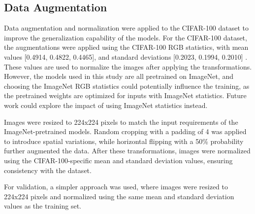 




\subsection{Data Augmentation}
Data augmentation and normalization were applied to the CIFAR-100 dataset to improve the generalization capability of the models. For the CIFAR-100 dataset, the augmentations were applied using the CIFAR-100 RGB statistics, with mean values [0.4914, 0.4822, 0.4465], and standard deviations [0.2023, 0.1994, 0.2010] \cite{kaidic_ldam_drw}. These values are used to normalize the images after applying the transformations. However, the models used in this study are all pretrained on ImageNet, and choosing the ImageNet RGB statistics could potentially influence the training, as the pretrained weights are optimized for inputs with ImageNet statistics. Future work could explore the impact of using ImageNet statistics instead.

Images were resized to 224x224 pixels to match the input requirements of the ImageNet-pretrained models. Random cropping with a padding of 4 was applied to introduce spatial variations, while horizontal flipping with a 50\% probability further augmented the data. After these transformations, images were normalized using the CIFAR-100-specific mean and standard deviation values, ensuring consistency with the dataset.

For validation, a simpler approach was used, where images were resized to 224x224 pixels and normalized using the same mean and standard deviation values as the training set.

